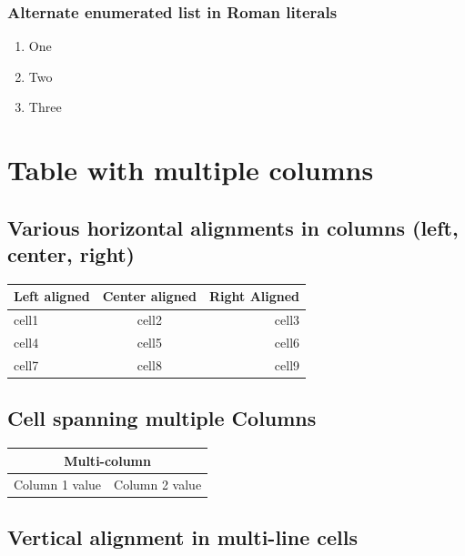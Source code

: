 \documentclass{article}
\begin{document}
    \subsubsection{Alternate enumerated list in Roman literals}
  \renewcommand{\theenumi}{\Roman{enumi}}%
\begin{enumerate}
  \item One
  \item Two
  \item Three
\end{enumerate}

\section{Table with multiple columns}
\subsection{Various horizontal alignments in columns (left, center, right)}

\begin{center}
\begin{tabular}[t]{ |l|c|r| } 
 \hline
 Left aligned & Center aligned & Right Aligned \\ 
 \hline
 cell1 & cell2 & cell3 \\ 
 \hline
 cell4 & cell5 & cell6 \\ 
 \hline
 cell7 & cell8 & cell9 \\ 
 \hline
\end{tabular}
\end{center}

\subsection{Cell spanning multiple Columns}


\begin{center}
\begin{tabular}{|c|c|}
    \hline
    \multicolumn{2}{|c|}{Multi-column}\\
        \hline
    Column 1 value & Column 2 value \\
    \hline
\end{tabular}
\end{center}


\subsection{Vertical alignment in multi-line cells}
    
\end{document}
